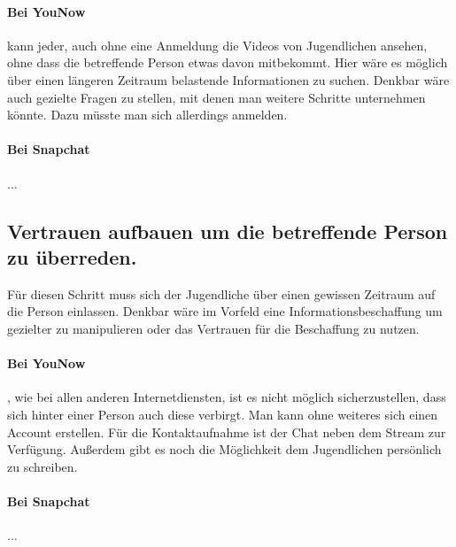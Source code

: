 \paragraph{Bei YouNow} kann jeder, auch ohne eine Anmeldung die Videos von Jugendlichen ansehen, ohne dass die betreffende Person etwas davon mitbekommt. Hier wäre es möglich über einen längeren Zeitraum belastende  Informationen zu suchen. Denkbar wäre auch gezielte Fragen zu stellen, mit denen man weitere Schritte unternehmen könnte. Dazu müsste man sich allerdings anmelden. 

\paragraph{Bei Snapchat} ...

\subsection{Vertrauen aufbauen um die betreffende Person zu überreden.}
Für diesen Schritt muss sich der Jugendliche über einen gewissen Zeitraum auf die Person einlassen. Denkbar wäre im Vorfeld eine Informationsbeschaffung um gezielter zu manipulieren oder das Vertrauen für die Beschaffung zu nutzen. 

\paragraph{Bei YouNow}, wie bei allen anderen Internetdiensten, ist es nicht möglich sicherzustellen, dass sich hinter einer Person auch diese verbirgt. Man kann ohne weiteres sich einen Account erstellen.  Für die Kontaktaufnahme ist der Chat neben dem Stream zur Verfügung. Außerdem gibt es noch die Möglichkeit dem Jugendlichen persönlich zu schreiben. 

\paragraph{Bei Snapchat} ...
